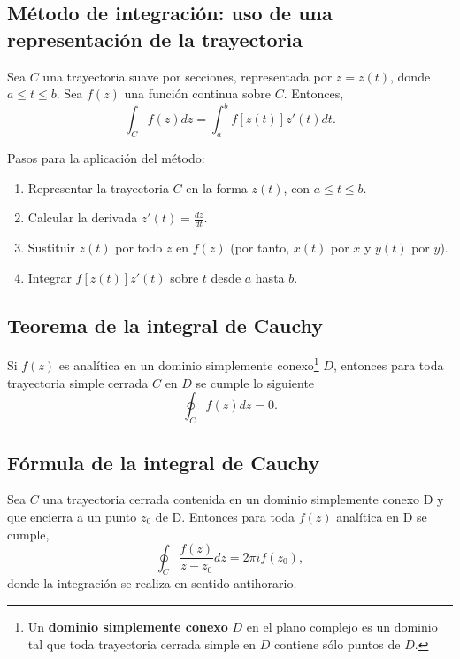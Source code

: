 \documentclass[10pt,a4paper]{article}
\begin{document}
\subsection*{M\'etodo de integraci\'on: uso de una representaci\'on de la 
trayectoria}

	Sea $C$ una trayectoria suave por secciones, representada por $z=z(t)$, 
	donde $a\leq t \leq b$. Sea $f(z)$ una funci\'on continua sobre $C$. Entonces,
	\begin{equation}
		\int_C f(z)dz = \int_a^b f[z(t)]z'(t)dt.
		\label{eq:ht1}
	\end{equation}
	
	Pasos para la aplicaci\'on del m\'etodo:
	\begin{enumerate}
	\item
	Representar la trayectoria $C$ en la forma $z(t)$, con $a\leq t\leq b$.
	\item
	Calcular la derivada $z'(t)=\tfrac{dz}{dt}$.
	\item
	Sustituir $z(t)$ por todo $z$ en $f(z)$ (por tanto, $x(t)$ por $x$ y $y(t)$ por $y$).
	\item
	Integrar $f[z(t)]z'(t)$ sobre $t$ desde $a$ hasta $b$.
	\end{enumerate}

\subsection*{Teorema de la integral de Cauchy}
Si $f(z)$ es anal\'itica en un dominio simplemente conexo\footnote{Un \textbf{dominio simplemente conexo} $D$ en el plano complejo es un dominio tal que toda trayectoria cerrada simple en $D$ contiene s\'olo puntos de $D$.} $D$, entonces para toda trayectoria simple cerrada $C$ en $D$ se cumple lo siguiente
\begin{equation}
\oint_C
f(z)dz=0.
\label{eq:ht_teoremaCauchy}
\end{equation}


\subsection*{F\'ormula de la integral de Cauchy}
Sea $C$ una trayectoria cerrada contenida en un dominio simplemente conexo D y 
que encierra a un punto $z_0$ de D. Entonces para toda $f(z)$ anal\'itica en D 
se cumple,
\begin{equation}
\oint_{C} \frac{f(z)}{z-z_0}dz =2\pi if(z_0),
\label{eq:ht6}
\end{equation}
donde la integraci\'on se realiza en sentido antihorario.
\end{document}
